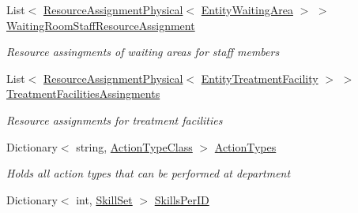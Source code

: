 \begin{DoxyCompactItemize}
List$<$ \hyperlink{class_general_health_care_elements_1_1_resource_handling_1_1_resource_assignment_physical}{Resource\+Assignment\+Physical}$<$ \hyperlink{class_general_health_care_elements_1_1_entities_1_1_entity_waiting_area}{Entity\+Waiting\+Area} $>$ $>$ \hyperlink{class_general_health_care_elements_1_1_input_1_1_generic_x_m_l_department_input_a208eac0212509c18ae7deb03feb26f55}{Waiting\+Room\+Staff\+Resource\+Assignment}
\begin{DoxyCompactList}\small\item\em Resource assingments of waiting areas for staff members \end{DoxyCompactList}\item 
List$<$ \hyperlink{class_general_health_care_elements_1_1_resource_handling_1_1_resource_assignment_physical}{Resource\+Assignment\+Physical}$<$ \hyperlink{class_general_health_care_elements_1_1_entities_1_1_entity_treatment_facility}{Entity\+Treatment\+Facility} $>$ $>$ \hyperlink{class_general_health_care_elements_1_1_input_1_1_generic_x_m_l_department_input_ad6ffebd2d49d7c1b5af2602b48a92608}{Treatment\+Facilities\+Assingments}
\begin{DoxyCompactList}\small\item\em Resource assignments for treatment facilities \end{DoxyCompactList}\item 
Dictionary$<$ string, \hyperlink{class_general_health_care_elements_1_1_general_classes_1_1_action_types_and_paths_1_1_action_type_class}{Action\+Type\+Class} $>$ \hyperlink{class_general_health_care_elements_1_1_input_1_1_generic_x_m_l_department_input_a5ac4307c348a62a76e1fa1267df488b9}{Action\+Types}
\begin{DoxyCompactList}\small\item\em Holds all action types that can be performed at department \end{DoxyCompactList}\item 
Dictionary$<$ int, \hyperlink{class_simulation_core_1_1_h_c_c_m_elements_1_1_skill_set}{Skill\+Set} $>$ \hyperlink{class_general_health_care_elements_1_1_input_1_1_generic_x_m_l_department_input_aa0c1631305a078b35d988b290cb7e241}{Skills\+Per\+ID}

\end{DoxyCompactItemize}
